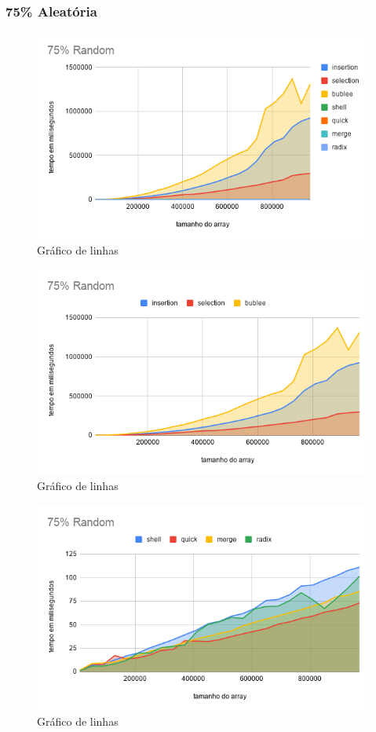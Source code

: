 \documentclass[a4paper, 12pt]{article}
\begin{document}
$  $ \\
\subsubsection{75\% Aleatória}
	\begin{figure}[!h]
	\caption{ Gráfico de linhas }
	\label{fig:75random1}
	\centering
	\includegraphics[width=1\textwidth, height=0.60\textwidth]{75Random}
	
\end{figure}
\begin{figure}[!h]
	\caption{ Gráfico de linhas }
	\label{fig:75random2}
	\centering
	\includegraphics[width=1\textwidth, height=0.57\textwidth]{75Random1}
\end{figure}

\begin{figure}[!h]
	\caption{ Gráfico de linhas }
	\label{fig:75random3}
	\centering
	\includegraphics[width=1\textwidth, height=0.57\textwidth]{75Random2}
\end{figure}
\newpage
\end{document}
